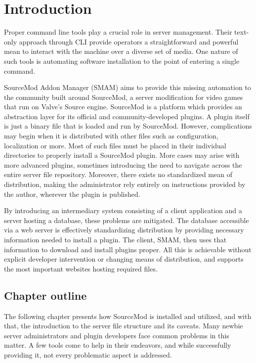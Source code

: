 \chapter{Introduction}

Proper command line tools play a crucial role in server management.
Their text-only approach through CLI provide operators a straightforward and powerful mean to interact with the machine over a diverse set of media.
One nature of such tools is automating software installation to the point of entering a single command.

SourceMod Addon Manager (SMAM) aims to provide this missing automation to the community built around SourceMod, a server modification for video games that run on Valve's Source engine.
SourceMod is a platform which provides an abstraction layer for its official and community-developed plugins.
A plugin itself is just a binary file that is loaded and run by SourceMod.
However, complications may begin when it is distributed with other files such as configuration, localization or more.
Most of such files must be placed in their individual directories to properly install a SourceMod plugin.
More cases may arise with more advanced plugins, sometimes introducing the need to navigate across the entire server file repository.
Moreover, there exists no standardized mean of distribution, making the administrator rely entirely on instructions provided by the author, wherever the plugin is published.

By introducing an intermediary system consisting of a client application and a server hosting a database, these problems are mitigated.
The database accessible via a web server is effectively standardizing distribution by providing necessary information needed to install a plugin.
The client, SMAM, then uses that information to download and install plugins proper.
All this is achievable without explicit developer intervention or changing means of distribution, and supports the most important websites hosting required files.

\section{Chapter outline}

The following chapter presents how SourceMod is installed and utilized, and with that, the introduction to the server file structure and its caveats.
Many newbie server administrators and plugin developers face common problems in this matter.
A few tools come to help in their endeavors, and while successfully providing it, not every problematic aspect is addressed.

